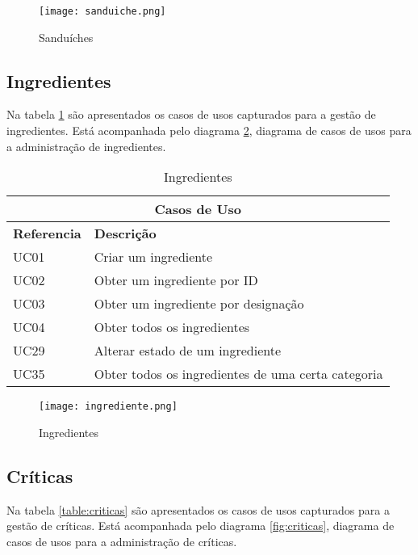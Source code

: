 \begin{figure}[H]
    \centering
    \texttt{[image: sanduiche.png]}
    \caption{Sanduíches}
    \label{fig:sanduiche}
\end{figure}
	

\newpage

\subsection{Ingredientes}

Na tabela \ref{table:ingredientes} são apresentados os casos de usos capturados para a gestão de ingredientes. Está acompanhada pelo diagrama \ref{fig:ingrediente}, diagrama de casos de usos para a administração de ingredientes.

\begin{table}[H]
\caption{Ingredientes}
\label{table:ingredientes}
\begin{center}
\begin{tabular}{ |p{2cm}|p{10cm}|  }
\hline
\multicolumn{2}{|c|}{Casos de Uso} \\
\hline
\textbf{Referencia} & \textbf{Descrição} \\
\hline
UC01 & Criar um ingrediente\\
\hline
UC02 & Obter um ingrediente por ID\\
\hline
UC03 & Obter um ingrediente por designação\\
\hline
UC04 & Obter todos os ingredientes\\
\hline
UC29 & Alterar estado de um ingrediente\\
\hline
UC35 & Obter todos os ingredientes de uma certa categoria\\

\hline
\end{tabular} 
\end{center}
\end{table}

\begin{figure}[H]
    \centering
    \texttt{[image: ingrediente.png]}
    \caption{Ingredientes}
    \label{fig:ingrediente}
\end{figure}
\newpage

\subsection{Críticas}

Na tabela \ref{table:criticas} são apresentados os casos de usos capturados para a gestão de críticas. Está acompanhada pelo diagrama \ref{fig:criticas}, diagrama de casos de usos para a administração de críticas.

